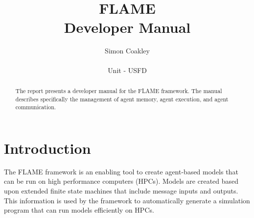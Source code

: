 \documentclass[a4paper,12pt]{article}
\begin{document}
\title{FLAME
\\Developer Manual}
\author{Simon Coakley
\\
\\ Unit - USFD}

\maketitle

\begin{abstract}
The report presents a developer manual for the FLAME framework. The manual
describes specifically the management of agent memory, agent execution, and
agent communication.
\end{abstract}

\pagebreak
\tableofcontents
\pagebreak

\section{Introduction}

The FLAME framework is an enabling tool to create agent-based models that can
be run on high performance computers (HPCs). Models are created based upon
extended finite state machines that include message inputs and outputs. This information
is used by the framework to automatically generate a simulation program that
can run models efficiently on HPCs.





%
%
\end{document}
